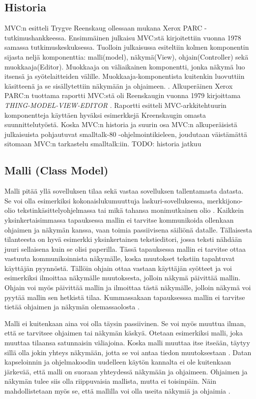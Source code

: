 \documentclass[finnish,utf8,nonumbib,palatino,kandi]{gradu2}
\begin{document}
\subsection{Historia}

MVC:n esitteli Trygve Reenskaug ollessaan mukana Xerox PARC -tutkimushankkeessa. Ensimmäinen julkaisu MVC:stä
kirjoitettiin vuonna 1978 samassa tutkimuskeskuksessa. Tuolloin julkaisussa esiteltiin kolmen komponentin sijasta neljä
komponenttia: malli(model), näkymä(View), ohjain(Controller) sekä muokkaaja(Editor). Muokkaaja on väliaikainen komponentti, jonka näkymä
luo itsensä ja syötelaitteiden välille. Muokkaaja-komponentista kuitenkin luovuttiin käsitteenä ja se sisällytettiin näkymään ja ohjaimeen. \cite{Reenskaug}.
Alkuperäinen Xerox PARC:n tuottama raportti MVC:stä oli Reenskaugin vuonna 1979 kirjoittama \emph{THING-MODEL-VIEW-EDITOR} \cite{reenskaug:1979}. Raportti 
esitteli MVC-arkkitehtuurin komponentteja käyttäen hyväksi esimerkkejä Kreenskaugin omasta suunnittelutyöstä. Koska MVC:n historia ja suurin osa MVC:n
alkuperäisistä julkaisuista pohjautuvat smalltalk-80 -ohjelmointikieleen, joudutaan väistämättä sitomaan MVC:n tarkastelu smalltalk:iin.  TODO: historia jatkuu 

\subsection{Malli (Class Model)}
Malli pitää yllä sovelluksen tilaa sekä vastaa sovelluksen tallentamasta datasta. Se voi olla esimerkiksi kokonaislukumuuttuja laskuri-sovelluksessa, merkkijono-olio tekstinkäsittelyohjelmassa tai
mikä tahansa monimutkainen olio \cite{Krasner}. Kaikkein yksinkertaisimmassa tapauksessa mallin ei tarvitse kommunikoida ollenkaan ohjaimen ja näkymän kanssa, vaan toimia passiivisena säiliönä datalle. 
Tällaisesta tilanteesta on hyvä esimerkki yksinkertainen tekstieditori, jossa teksti nähdään juuri sellaisena kuin se olisi paperilla. Tässä tapauksessa mallin ei tarvitse ottaa vastuuta
kommunikoinnista näkymälle, koska muutokset tekstiin tapahtuvat käyttäjän pyynnöstä. Tällöin ohjain ottaa vastaan käyttäjän syötteet ja voi esimerkiksi ilmoittaa näkymälle muutoksesta, jolloin näkymä
päivittää mallin. Ohjain voi myös päivittää mallin ja ilmoittaa tästä näkymälle, jolloin näkymä voi pyytää mallin sen hetkistä tilaa. Kummassakaan tapauksesssa mallin ei tarvitse tietää ohjaimen ja näkymän
olemassaolosta \cite{Burbeck}. 

Malli ei kuitenkaan aina voi olla täysin passiivinen. Se voi myös muuttua ilman, että se tarvitsee ohjaimen tai näkymän käskyä. Otetaan esimerkiksi malli, joka muuttaa tilaansa satunnaisin väliajoina. Koska malli muuttaa itse itseään, täytyy sillä olla jokin yhteys näkymään, jotta se voi antaa tiedon muutoksestaan \cite{Burbeck}. Datan kapseloinnin ja ohjelmakoodin uudelleen käytön kannalta ei ole kuitenkaan järkevää, että malli on suoraan yhteydessä näkymään ja ohjaimeen. Ohjaimen ja näkymän tulee siis olla riippuvaisia mallista, mutta ei toisinpäin. Näin mahdollistetaan myös se, että mallilla voi olla useita näkymiä ja ohjaimia \cite{Krasner[s. 27]}.
\end{document}
